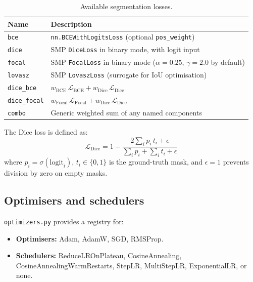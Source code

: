 \documentclass[12pt,a4paper]{article}
\begin{document}
\begin{table}[h]
  \centering
  \caption{Available segmentation losses.}
  \label{tab:losses}
  \begin{tabular}{L{3.5cm} L{10.5cm}}
    \toprule
    \textbf{Name} & \textbf{Description} \\
    \midrule
    \texttt{bce}        & \texttt{nn.BCEWithLogitsLoss} (optional \texttt{pos\_weight}) \\
    \texttt{dice}       & SMP \texttt{DiceLoss} in binary mode, with logit input \\
    \texttt{focal}      & SMP \texttt{FocalLoss} in binary mode ($\alpha=0.25$, $\gamma=2.0$ by default) \\
    \texttt{lovasz}     & SMP \texttt{LovaszLoss} (surrogate for IoU optimisation) \\
    \texttt{dice\_bce}  & $w_\text{BCE}\,\mathcal{L}_\text{BCE} + w_\text{Dice}\,\mathcal{L}_\text{Dice}$ \\
    \texttt{dice\_focal}& $w_\text{Focal}\,\mathcal{L}_\text{Focal} + w_\text{Dice}\,\mathcal{L}_\text{Dice}$ \\
    \texttt{combo}      & Generic weighted sum of any named components \\
    \bottomrule
  \end{tabular}
\end{table}

The Dice loss is defined as:
\begin{equation}
  \mathcal{L}_\text{Dice} = 1 - \frac{2\sum_i p_i\,t_i + \epsilon}
                                     {\sum_i p_i + \sum_i t_i + \epsilon}
\end{equation}
where $p_i = \sigma(\text{logit}_i)$, $t_i \in \{0,1\}$ is the ground-truth mask,
and $\epsilon = 1$ prevents division by zero on empty masks.

\subsection{Optimisers and schedulers}

\texttt{optimizers.py} provides a registry for:

\begin{itemize}[leftmargin=1.5em]
  \item \textbf{Optimisers:} Adam, AdamW, SGD, RMSProp.
  \item \textbf{Schedulers:} ReduceLROnPlateau, CosineAnnealing,
    CosineAnnealingWarmRestarts, StepLR, MultiStepLR, ExponentialLR, or none.
\end{itemize}
\end{document}
